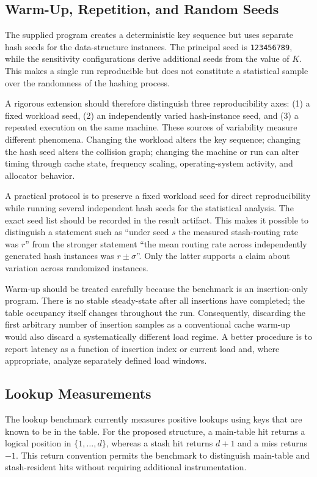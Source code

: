 \documentclass[conference]{IEEEtran}
\begin{document}
\subsection{Warm-Up, Repetition, and Random Seeds}

The supplied program creates a deterministic key sequence but uses separate
hash seeds for the data-structure instances. The principal seed is
\texttt{123456789}, while the sensitivity configurations derive additional
seeds from the value of $K$. This makes a single run reproducible but does not
constitute a statistical sample over the randomness of the hashing process.

A rigorous extension should therefore distinguish three reproducibility axes:
(1) a fixed workload seed, (2) an independently varied hash-instance seed, and
(3) a repeated execution on the same machine. These sources of variability
measure different phenomena. Changing the workload alters the key sequence;
changing the hash seed alters the collision graph; changing the machine or run
can alter timing through cache state, frequency scaling, operating-system
activity, and allocator behavior.

A practical protocol is to preserve a fixed workload seed for direct
reproducibility while running several independent hash seeds for the statistical
analysis. The exact seed list should be recorded in the result artifact. This
makes it possible to distinguish a statement such as ``under seed $s$ the
measured stash-routing rate was $r$'' from the stronger statement ``the mean
routing rate across independently generated hash instances was $r\pm\sigma$''.
Only the latter supports a claim about variation across randomized instances.

Warm-up should be treated carefully because the benchmark is an insertion-only
program. There is no stable steady-state after all insertions have completed;
the table occupancy itself changes throughout the run. Consequently, discarding
the first arbitrary number of insertion samples as a conventional cache warm-up
would also discard a systematically different load regime. A better procedure
is to report latency as a function of insertion index or current load and, where
appropriate, analyze separately defined load windows.

\subsection{Lookup Measurements}

The lookup benchmark currently measures positive lookups using keys that are
known to be in the table. For the proposed structure, a main-table hit returns a
logical position in $\{1,\ldots,d\}$, whereas a stash hit returns $d+1$ and a
miss returns $-1$. This return convention permits the benchmark to distinguish
main-table and stash-resident hits without requiring additional instrumentation.
\end{document}
